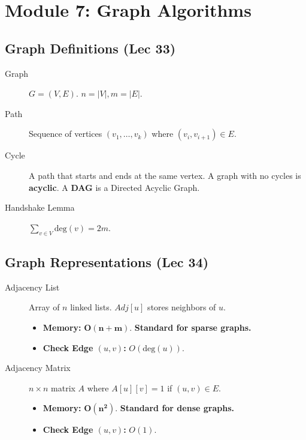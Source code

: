 
\section{Module 7: Graph Algorithms}

\subsection{Graph Definitions (Lec 33)}
\begin{description}
    \item[Graph] $G = (V, E)$. $n = |V|, m = |E|$.
    \item[Path] Sequence of vertices $(v_1, \dots, v_k)$ where $(v_i, v_{i+1}) \in E$.
    \item[Cycle] A path that starts and ends at the same vertex. A graph with no cycles is \textbf{acyclic}. A \textbf{DAG} is a Directed Acyclic Graph.
    \item[Handshake Lemma] $\sum_{v \in V} \text{deg}(v) = 2m$.
\end{description}

\subsection{Graph Representations (Lec 34)}
\begin{description}
    \item[Adjacency List] Array of $n$ linked lists. $Adj[u]$ stores neighbors of $u$.
    \begin{itemize}
        \item \textbf{Memory:} $\mathbf{O(n+m)}$. \textbf{Standard for sparse graphs.}
        \item \textbf{Check Edge $(u, v)$:} $O(\text{deg}(u))$.
    \end{itemize}
    \item[Adjacency Matrix] $n \times n$ matrix $A$ where $A[u][v] = 1$ if $(u, v) \in E$.
    \begin{itemize}
        \item \textbf{Memory:} $\mathbf{O(n^2)}$. \textbf{Standard for dense graphs.}
        \item \textbf{Check Edge $(u, v)$:} $O(1)$.
    \end{itemize}
\end{description}

